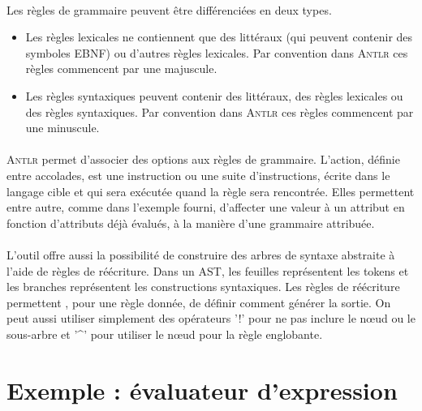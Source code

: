 \documentclass[paper=a4, fontsize=11pt]{scrartcl} %
\numberwithin{equation}{section} %
\numberwithin{figure}{section} %
\numberwithin{table}{section} %
\begin{document}
\paragraph{}Les règles de grammaire peuvent être différenciées en deux types.
\begin{itemize}
 \item Les règles lexicales ne contiennent que des littéraux (qui peuvent 
 contenir des symboles EBNF) ou d'autres règles lexicales. Par convention dans 
 \textsc{Antlr} ces règles commencent par une majuscule.
 \item Les règles syntaxiques peuvent contenir des littéraux, des règles 
 lexicales ou des règles syntaxiques. Par convention dans \textsc{Antlr} ces 
 règles commencent par une minuscule.
\end{itemize}

\paragraph{}\textsc{Antlr} permet d'associer des options aux règles de grammaire. L'action, définie entre accolades, est une instruction ou une suite d'instructions, écrite dans le langage cible et qui sera exécutée quand la règle sera rencontrée. Elles permettent entre autre, comme dans l'exemple fourni, d'affecter une valeur à un attribut en fonction d'attributs déjà évalués, à la manière d'une grammaire attribuée.

\paragraph{}L'outil offre aussi la possibilité de construire des arbres de syntaxe abstraite à l'aide de règles de réécriture. Dans un AST, les feuilles représentent les tokens et les branches représentent les constructions syntaxiques. Les règles de réécriture permettent , pour une règle donnée, de définir comment générer la sortie. On peut aussi utiliser simplement des opérateurs '!' pour ne pas inclure le nœud ou le sous-arbre et '\textbf{\^}' pour utiliser le nœud pour la règle englobante.


\section{Exemple : évaluateur d'expression}
\end{document}
